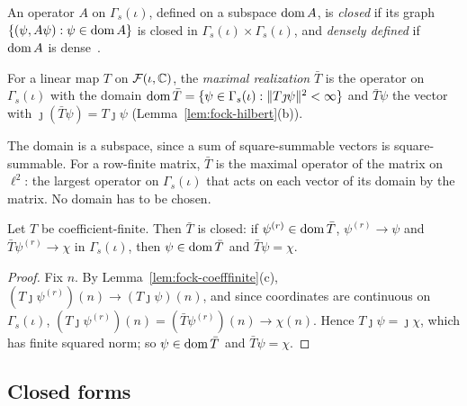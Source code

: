 \begin{vetbenv}
An operator $A$ on $\Gamma_s(\iota)$, defined on a subspace $\operatorname{dom} A$, is \emph{closed} if its graph
$\{(\psi,A\psi):\psi\in\operatorname{dom} A\}$ is closed in $\Gamma_s(\iota)\times\Gamma_s(\iota)$, and \emph{densely
defined} if $\operatorname{dom} A$ is dense~\cite[III\,\S5]{kato}.

\begin{definition}\label{def:fock-maxreal}
For a linear map $T$ on $\mathcal F(\iota,\mathbb C)$, the \emph{maximal realization} $\bar T$ is the operator on
$\Gamma_s(\iota)$ with the domain $\operatorname{dom}\bar T=\{\psi\in\Gamma_s(\iota):\lVert T\jmath\psi\rVert^2<\infty\}$
and $\bar T\psi$ the vector with $\jmath(\bar T\psi)=T\jmath\psi$ (Lemma~\ref{lem:fock-hilbert}(b)).
\end{definition}

The domain is a subspace, since a sum of square-summable vectors is square-summable. For a
row-finite matrix, $\bar T$ is the maximal operator of the matrix on $\ell^2$: the largest operator on
$\Gamma_s(\iota)$ that acts on each vector of its domain by the matrix. No domain has to be chosen.

\begin{theorem}\label{thm:fock-maxreal-closed}
Let $T$ be coefficient-finite. Then $\bar T$ is closed: if $\psi^{(r)}\in\operatorname{dom}\bar T$, $\psi^{(r)}\to
\psi$ and $\bar T\psi^{(r)}\to\chi$ in $\Gamma_s(\iota)$, then $\psi\in\operatorname{dom}\bar T$ and $\bar T\psi=\chi$.
\end{theorem}

\begin{proof}
Fix $n$. By Lemma~\ref{lem:fock-coefffinite}(c), $(T\jmath\psi^{(r)})(n)\to(T\jmath\psi)(n)$, and since
coordinates are continuous on $\Gamma_s(\iota)$, $(T\jmath\psi^{(r)})(n)=(\bar T\psi^{(r)})(n)\to\chi(n)$.
Hence $T\jmath\psi=\jmath\chi$, which has finite squared norm; so $\psi\in\operatorname{dom}\bar T$ and $\bar T\psi=\chi$.
\end{proof}

\subsection{Closed forms}\label{sec:fock-closedforms}


\end{vetbenv}
